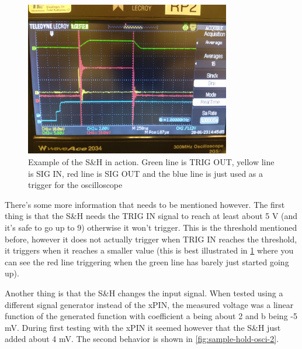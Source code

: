 \documentclass[a4paper, 10pt]{article}
\begin{document}
\begin{figure}[H]
    \centering
    \includegraphics[width=0.8\textwidth]{../images/sample-hold-osci.jpg}
    \caption{Example of the S\&H in action. Green line is TRIG OUT, yellow line is SIG IN, red line is SIG OUT and the blue line is just used as a trigger for the oscilloscope}
    \label{fig:sample-hold-osci}
\end{figure}

There's some more information that needs to be mentioned however.
The first thing is that the S\&H needs the TRIG IN signal to reach at least about 5 \si{\volt} (and it's safe to go up to 9) otherwise it won't trigger.
This is the threshold mentioned before, however it does not actually trigger when TRIG IN reaches the threshold, it triggers when it reaches a smaller value (this is best illustrated in \cref{fig:sample-hold-osci} where you can see the red line triggering when the green line has barely just started going up).

Another thing is that the S\&H changes the input signal.
When tested using a different signal generator instead of the xPIN, the measured voltage was a linear function of the generated function with coefficient a being about 2 and b being -5 \si{\milli\volt}.
During first testing with the xPIN it seemed however that the S\&H just added about 4 \si{\milli\volt}.
The second behavior is shown in \cref{fig:sample-hold-osci-2}.
\end{document}
